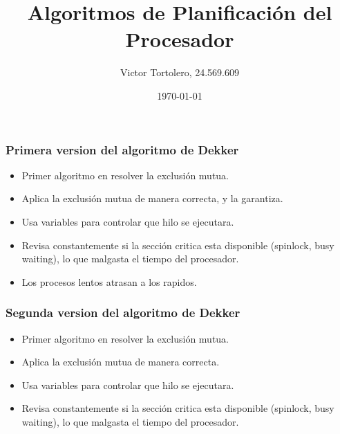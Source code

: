 \documentclass{beamer}
\title{Algoritmos de Planificación del Procesador}
\author{Victor Tortolero, 24.569.609}
\institute{
	Sistemas Operativos, FACYT
}
\date{\today}
\begin{document}

\begin{frame}
	\titlepage

\end{frame}
\author{ }


\begin{frame}
\frametitle{Primera version del algoritmo de Dekker}

\begin{itemize}
	\item Primer algoritmo en resolver la exclusión mutua.
	\item Aplica la exclusión mutua de manera correcta, y la garantiza.
	\item Usa variables para controlar que hilo se ejecutara.
	\item Revisa constantemente si la sección critica esta disponible (spinlock, busy waiting),
	lo que malgasta el tiempo del procesador.
	\item Los procesos lentos atrasan a los rapidos.
\end{itemize}
\end{frame}


\begin{frame}
	\frametitle{Segunda version del algoritmo de Dekker}
	
	\begin{itemize}
		\item Primer algoritmo en resolver la exclusión mutua.
		\item Aplica la exclusión mutua de manera correcta.
		\item Usa variables para controlar que hilo se ejecutara.
		\item Revisa constantemente si la sección critica esta disponible (spinlock, busy waiting),
		lo que malgasta el tiempo del procesador.
	\end{itemize}
\end{frame}
\end{document}
